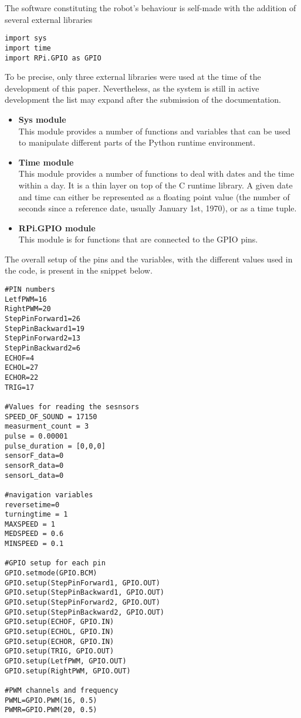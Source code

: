 The software constituting the robot's behaviour is self-made with the addition of several external libraries 

\begin{lstlisting}
import sys
import time
import RPi.GPIO as GPIO
\end{lstlisting}

To be precise, only three external libraries were used at the time of the development of this paper. Nevertheless, as the system is still in active development the list may expand after the submission of the documentation.

\begin{itemize}

\item \textbf{Sys module} \\ This module provides a number of functions and variables that can be used to manipulate different parts of the Python runtime environment. 

\item \textbf{Time module} \\ This module provides a number of functions to deal with dates and the time within a day. It is a thin layer on top of the C runtime library.
A given date and time can either be represented as a floating point value (the number of seconds since a reference date, usually January 1st, 1970), or as a time tuple. 

\item \textbf{RPi.GPIO module} \\ This module is for functions that are connected to the GPIO pins.
\end{itemize}

The overall setup of the pins and the variables, with the different values used in the code, is present in the snippet below.

\begin{lstlisting}
#PIN numbers
LetfPWM=16
RightPWM=20
StepPinForward1=26
StepPinBackward1=19
StepPinForward2=13
StepPinBackward2=6
ECHOF=4
ECHOL=27
ECHOR=22
TRIG=17

#Values for reading the sesnsors
SPEED_OF_SOUND = 17150
measurment_count = 3
pulse = 0.00001	
pulse_duration = [0,0,0]
sensorF_data=0
sensorR_data=0
sensorL_data=0

#navigation variables
reversetime=0
turningtime = 1
MAXSPEED = 1
MEDSPEED = 0.6
MINSPEED = 0.1

#GPIO setup for each pin 
GPIO.setmode(GPIO.BCM)
GPIO.setup(StepPinForward1, GPIO.OUT)
GPIO.setup(StepPinBackward1, GPIO.OUT)
GPIO.setup(StepPinForward2, GPIO.OUT)
GPIO.setup(StepPinBackward2, GPIO.OUT)
GPIO.setup(ECHOF, GPIO.IN)
GPIO.setup(ECHOL, GPIO.IN)
GPIO.setup(ECHOR, GPIO.IN)
GPIO.setup(TRIG, GPIO.OUT)
GPIO.setup(LetfPWM, GPIO.OUT)
GPIO.setup(RightPWM, GPIO.OUT)

#PWM channels and frequency
PWML=GPIO.PWM(16, 0.5)
PWMR=GPIO.PWM(20, 0.5)
\end{lstlisting}

